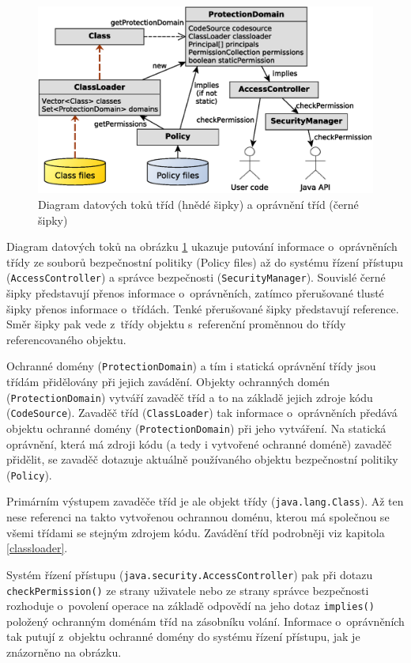 \begin{figure}[ht]
  \centering
  \includegraphics[width=14cm]{fig/domain-schema}
  \caption{Diagram datových toků tříd (hnědé šipky) a oprávnění tříd (černé šipky)}
  \label{diagramDatovychToku}
\end{figure}

Diagram datových toků na obrázku \ref{diagramDatovychToku} ukazuje putování informace o~oprávněních třídy ze souborů bezpečnostní politiky (Policy files) až do systému řízení přístupu ({\tt AccessController}) a správce bezpečnosti ({\tt SecurityManager}). Souvislé černé šipky představují přenos informace o~oprávněních, zatímco přerušované tlusté šipky přenos informace o~třídách. Tenké přerušované šipky představují reference. Směr šipky pak vede z~třídy objektu s~referenční proměnnou do třídy referencovaného objektu.

Ochranné domény ({\tt ProtectionDomain}) a tím i statická oprávnění třídy jsou třídám přidělovány při jejich zavádění.
Objekty ochranných domén ({\tt ProtectionDomain}) vytváří zavaděč tříd a to na základě jejich zdroje kódu ({\tt CodeSource}).
Zavaděč tříd ({\tt ClassLoader}) tak informace o~oprávněních předává objektu ochranné domény ({\tt ProtectionDomain}) při jeho vytváření.
Na statická oprávnění, která má zdroji kódu (a tedy i vytvořené ochranné doméně) zavaděč přidělit, se zavaděč dotazuje aktuálně používaného objektu bezpečnostní politiky ({\tt Policy}).

Primárním výstupem zavaděče tříd je ale objekt třídy ({\tt java.lang.Class}).
Až ten nese referenci na takto vytvořenou ochrannou doménu, kterou má společnou se všemi třídami se stejným zdrojem kódu.
Zavádění tříd podrobněji viz kapitola \ref{classloader}.

Systém řízení přístupu ({\tt java.security.AccessController}) pak při dotazu {\tt checkPermission()} ze strany uživatele nebo ze strany správce bezpečnosti rozhoduje o~povolení operace na základě odpovědí na jeho dotaz {\tt implies()} položený ochranným doménám tříd na zásobníku volání.
Informace o~oprávněních tak putují z~objektu ochranné domény do systému řízení přístupu, jak je znázorněno na obrázku.

